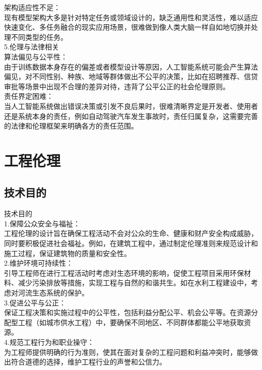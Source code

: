 \documentclass[supercite]{Experimental_Report}
\theoremstyle{definition}
\begin{document}
	架构适应性不足：\\现有模型架构大多是针对特定任务或领域设计的，缺乏通用性和灵活性，难以适应快速变化、多任务融合的现实应用场景，很难做到像人类大脑一样自如地切换并处理不同类型的任务。
	\\5.伦理与法律相关\\
	算法偏见与公平性：\\由于训练数据本身存在的偏差或者模型设计等原因，人工智能系统可能会产生算法偏见，对不同性别、种族、地域等群体做出不公平的决策，比如在招聘推荐、信贷审批等场景中出现不合理的差异对待，违背了公平公正的社会伦理原则。\\
	责任界定困难：\\当人工智能系统做出错误决策或引发不良后果时，很难清晰界定是开发者、使用者还是系统本身的责任，例如自动驾驶汽车发生事故时，责任归属复杂，这需要完善的法律和伦理框架来明确各方的责任范围。
	

	\section{工程伦理}
	
	\subsection{技术目的}
	技术目的\\
	1.保障公众安全与福祉：\\工程伦理的设计旨在确保工程活动不会对公众的生命、健康和财产安全构成威胁，同时要积极促进社会福祉。例如，在建筑工程中，通过制定伦理准则来规范设计和施工过程，保证建筑物的质量和安全性。\\
	2.维护环境可持续性：\\引导工程师在进行工程活动时考虑对生态环境的影响，促使工程项目采用环保材料、减少污染排放等措施，实现工程与自然的和谐共生。如在水利工程建设中，考虑对河流生态系统的保护。\\
	3.促进公平与公正：\\保证工程决策和实施过程中的公平性，包括利益分配公平、机会公平等。在资源分配型工程（如城市供水工程）中，要确保不同地区、不同群体都能公平地获取资源。\\
	4.规范工程行为和职业操守：\\为工程师提供明确的行为准则，使其在面对复杂的工程问题和利益冲突时，能够做出符合道德的选择，维护工程行业的声誉和公信力。\\
	
\end{document}
